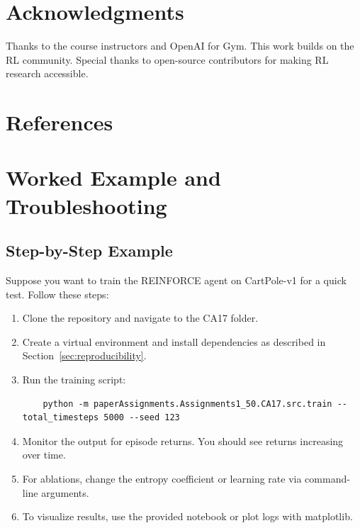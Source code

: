 \documentclass[conference]{IEEEtran}
\begin{document}
\section*{Acknowledgments}

Thanks to the course instructors and OpenAI for Gym. This work builds on the RL community. Special thanks to open-source contributors for making RL research accessible.

\section*{References}





\appendices

\section{Worked Example and Troubleshooting}
\label{app:workedexample}

\subsection{Step-by-Step Example}

Suppose you want to train the REINFORCE agent on CartPole-v1 for a quick test. Follow these steps:

\begin{enumerate}
    \item Clone the repository and navigate to the CA17 folder.
    \item Create a virtual environment and install dependencies as described in Section~\ref{sec:reproducibility}.
    \item Run the training script:
    \begin{verbatim}
    python -m paperAssignments.Assignments1_50.CA17.src.train --total_timesteps 5000 --seed 123
    \end{verbatim}
    \item Monitor the output for episode returns. You should see returns increasing over time.
    \item For ablations, change the entropy coefficient or learning rate via command-line arguments.
    \item To visualize results, use the provided notebook or plot logs with matplotlib.
\end{enumerate}
\end{document}
